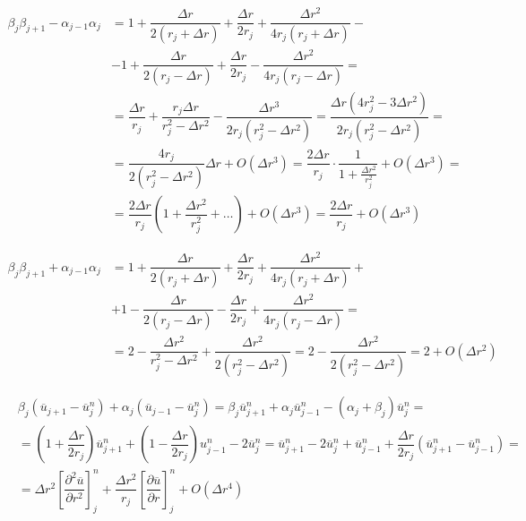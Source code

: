 \begin{equation} \label{bb-aa}
\begin{split}
	\beta_j \beta_{j+1} - \alpha_{j-1} \alpha_j &= 1 + \dfrac{\Delta r}{2(r_j + \Delta r)} + \dfrac{\Delta r}{2 r_j} + \dfrac{\Delta r^2}{4 r_j (r_j + \Delta r)} - \\
	&-1 + \dfrac{\Delta r}{2(r_j - \Delta r)} + \dfrac{\Delta r}{2r_j} - \dfrac{\Delta r^2}{4r_j (r_j - \Delta r)} = \\
	&= \dfrac{\Delta r}{r_j} + \dfrac{r_j \Delta r}{r_j^2 - \Delta r^2} - \dfrac{\Delta r^3}{2r_j(r_j^2 - \Delta r^2)} = 
	\dfrac{\Delta r (4r_j^2 - 3 \Delta r^2)}{2r_j(r_j^2 - \Delta r^2)} = \\
	& = \dfrac{4 r_j}{2(r_j^2 - \Delta r^2)} \Delta r + O(\Delta r^3) = \dfrac{2\Delta r}{r_j} \cdot \dfrac{1}{1+\frac{\Delta r^2}{r_j^2}} + O(\Delta r^3) = \\
	& = \dfrac{2\Delta r}{r_j} \left( 1 + \dfrac{\Delta r^2}{r_j^2} + \dots \right) + O(\Delta r^3) = \dfrac{2\Delta r}{r_j} + O(\Delta r^3)
\end{split}
\end{equation}

\begin{equation} \label{bb+aa}
\begin{split}
	\beta_j \beta_{j+1} + \alpha_{j-1} \alpha_j &= 1 + \dfrac{\Delta r}{2(r_j + \Delta r)} + \dfrac{\Delta r}{2 r_j} + \dfrac{\Delta r^2}{4 r_j (r_j + \Delta r)} + \\
	&+1 - \dfrac{\Delta r}{2(r_j - \Delta r)} - \dfrac{\Delta r}{2r_j} + \dfrac{\Delta r^2}{4r_j (r_j - \Delta r)} = \\
	&= 2 - \dfrac{\Delta r^2}{r_j^2 - \Delta r^2} + \dfrac{\Delta r^2}{2(r_j^2 - \Delta r^2)} = 2 - \dfrac{\Delta r^2}{2(r_j^2 - \Delta r^2)} = 2 + O(\Delta r^2)
\end{split}	
\end{equation}

\begin{equation} \label{s}
\begin{split}
	&\beta_j \left( \overline{u}_{j+1} - \overline{u}_j^n \right) + \alpha_j \left( \overline{u}_{j-1} - \overline{u}_j^n \right) = \beta_j \overline{u}_{j+1}^n + \alpha_j \overline{u}_{j-1}^n - (\alpha_j + \beta_j) \overline{u}_j^n = \\
	&= \left( 1 + \dfrac{\Delta r}{2r_j} \right) \overline{u}_{j+1}^n + \left( 1 - \dfrac{\Delta r}{2r_j} \right) u_{j-1}^n - 2\overline{u}_j^n = \overline{u}_{j+1}^n - 2\overline{u}_j^n + \overline{u}_{j-1}^n + \dfrac{\Delta r}{2 r_j} \left( \overline{u}_{j+1}^n - \overline{u}_{j-1}^n \right) = \\
	&= \Delta r^2 \left[ \dfrac{\partial^2 \overline{u}}{\partial r^2} \right]_j^n + \dfrac{\Delta r^2}{r_j} \left[ \dfrac{\partial \overline{u}}{\partial r} \right]_j^n + O(\Delta r^4)
\end{split}
\end{equation}




